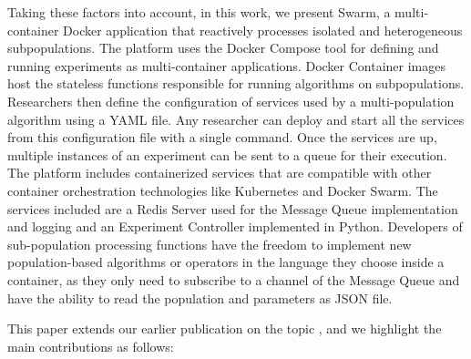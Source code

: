 \documentclass[review]{elsarticle}
\begin{document}
Taking these factors into account, in this work, we present Swarm, %
a
multi-container Docker application that reactively processes isolated and
heterogeneous subpopulations. The platform uses the Docker Compose tool for
defining and running experiments as multi-container applications. %
Docker
Container images host the stateless functions responsible for running algorithms
on subpopulations. Researchers then define the configuration of services used by
a multi-population algorithm using a YAML file. Any researcher can deploy and
start all the services from this configuration file with a single command. Once
the services are up, multiple instances of an experiment can be sent to a queue
for their execution. The platform includes containerized services that are
compatible with other container orchestration technologies like Kubernetes and
Docker Swarm. The services included are a Redis Server used for the Message
Queue implementation and logging and an Experiment Controller implemented in
Python. Developers of sub-population processing functions have the freedom to
implement new population-based algorithms or operators in the language they
choose inside a container, as they only need to subscribe to a channel of the
Message Queue and have the ability to read the population and parameters as JSON  
file.

This paper extends our earlier publication on the topic
\cite{guervos2018introducing}, and we highlight the main contributions as
follows:
\end{document}
